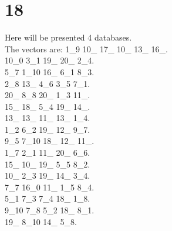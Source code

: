 \chapter{18}
\indent Here will be presented 4 databases.\\
The vectors are:
1\_9 10\_ 17\_ 10\_ 13\_ 16\_.\\10\_0 3\_1 19\_ 20\_ 2\_4.\\5\_7 1\_10 16\_ 6\_1 8\_3.\\2\_8 13\_ 4\_6 3\_5 7\_1.\\20\_ 8\_8 20\_ 1\_3 11\_.\\15\_ 18\_ 5\_4 19\_ 14\_.\\13\_ 13\_ 11\_ 13\_ 1\_4.\\1\_2 6\_2 19\_ 12\_ 9\_7.\\9\_5 7\_10 18\_ 12\_ 11\_.\\1\_7 2\_1 11\_ 20\_ 6\_6.\\15\_ 10\_ 19\_ 5\_5 8\_2.\\10\_ 2\_3 19\_ 14\_ 3\_4.\\7\_7 16\_0 11\_ 1\_5 8\_4.\\5\_1 7\_3 7\_4 18\_ 1\_8.\\9\_10 7\_8 5\_2 18\_ 8\_1.\\19\_ 8\_10 14\_ 5\_8.\\